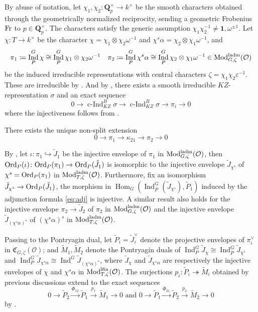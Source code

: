 \documentclass[leqno]{amsart}
\newcommand{\laMod}{\textnormal{Mod}^{\textnormal{ladm}}}
\newcommand{\lfMod}{\textnormal{Mod}^{\textnormal{lfin}}}
\newcommand{\Ord}{\textnormal{Ord}}
\newcommand{\Fr}{\textnormal{Fr}}
\newcommand{\Qp}{\mathbf{Q}_p}
\newcommand{\oo}{\mathcal O}
\newcommand{\id}{\mathbf{1}}
\newcommand{\1}{\mathbf{1}}
\newcommand{\fC}{\mathfrak C}
\DeclareMathOperator{\Hom}{Hom}
\DeclareMathOperator{\Ind}{Ind}
\DeclareMathOperator{\cInd}{c-Ind}
\theoremstyle{definition}
\theoremstyle{remark}
\begin{document}
By abuse of notation,
let $\chi_1,\chi_2\colon \Qp^\times\to k^\times$
be the smooth characters obtained through
the geometrically normalized reciprocity,
sending a geometric Frobenius $\Fr$ to $p\in \Qp^\times$.
The characters satisfy the generic assumption
$\chi_1\chi_2^{-1}\neq \id,\omega^{\pm1}$.
Let $\chi\colon T\to k^\times$
be the character  $\chi=\chi_1\otimes\chi_2\omega^{-1}$
and  $\chi^s\alpha=\chi_2\otimes \chi_1\omega^{-1}$, and
\[
\pi_1\coloneqq \Ind_{P}^G\chi\cong
\Ind_{P}^G\chi_1\otimes\chi_2\omega^{-1}\quad
\pi_2\coloneqq \Ind_{P}^G\chi^s\alpha\cong 
\Ind_{P}^G\chi_2\otimes\chi_1\omega^{-1} \in \laMod_{G,\zeta}(\oo)
\]
be the induced irreducible representations
with central characters $\zeta=\chi_1\chi_2\varepsilon^{-1}$.
These are irreducible by \cite[Thm 30]{barthel}.
And by \cite[Thm 33]{barthel}, there exists
a smooth irreducible $KZ$-representation  $\sigma$
and an exact sequence
\begin{equation}
	0\to \cInd_{KZ}^B\sigma\to
	\cInd_{KZ}^B\sigma\to \pi_i\to 0
\end{equation}
where the injectiveness follows from \cite[Thm 19]{barthel}.
\cite{barthel}

There exists the unique non-split extension
\[
	0\to \pi_1\to \kappa_{21}\to \pi_2\to 0
\]


By \cite[Prop 7.1]{pask},
let $\iota\colon \pi_1\hookrightarrow \tilde{J}_1$
be the injective envelope of $\pi_1$
in $\laMod_{G,\zeta}(\oo)$,
then $\Ord_P(\iota)\colon \Ord_P(\pi_1)\to \Ord_P(\tilde{J}_1)$
is isomorphic to the injective envelope $\tilde{J}_{\chi^s}$ 
of $\chi^s=\Ord_P(\pi_1)$
in $\laMod_{T,\zeta}(\oo)$.
Furthermore, 
fix an isomorphism $\tilde{J}_{\chi^s}\to \Ord_P(\tilde{J}_1)$,
the morphism in $\Hom_{G}(\Ind_{\bar{P}}^G(\tilde{J}_{\chi^s}), \tilde{P}_1)$
induced by the adjunction formula \eqref{eq:adj}
is injective.
A similar result also holds for
the injective envelope $\pi_2\to\tilde{J}_2$ of $\pi_2$
in $\laMod_{G,\zeta}(\oo)$
and the injective envelope $\tilde{J}_{(\chi^s\alpha)^s}$ of $(\chi^s\alpha)^s$
in $\laMod_{T,\zeta}(\oo)$.

Passing to the Pontryagin dual,
let $\tilde{P}_i=\tilde{J}_i^\vee$ denote
the projective envelopes of $\pi_i^\vee$
in  $\fC_{G,\zeta}(\oo)$;
and $\tilde{M}_1, \tilde{M}_2$ denote
the Pontryagin duals of 
$\Ind_P^G\tilde{J}_\chi\cong\Ind_{\bar{P}}^G \tilde{J}_{\chi^s}$ and 
$\Ind_P^G\tilde{J}_{\chi^s\alpha}\cong
\Ind_{\bar{}}^G\tilde{J}_{(\chi^s\alpha)^s}$,
where $ \tilde{J}_\chi$ and $\tilde{J}_{\chi^s\alpha}$
are respectively the injective envelopes
of $\chi$ and  $\chi^s\alpha$ in  $\lfMod_{T,\zeta}(\oo)$.
The surjections
$p_i\colon \tilde{P}_i\twoheadrightarrow \tilde{M}_i$
obtained by previous discussions
extend to the exact sequences
\begin{equation}\label{eq:exact}
	0\to \tilde{P}_{2}\xrightarrow{\Phi_{12}} 
	\tilde{P}_{1}\xrightarrow{p_1} \tilde{M}_1\to 0 \text{ and }
	0\to \tilde{P}_{1}\xrightarrow{\Phi_{21}} 
	\tilde{P}_{2}\xrightarrow{p_2} \tilde{M}_2\to 0
\end{equation}
by \cite[Cor 7.7]{pask}.
\end{document}
